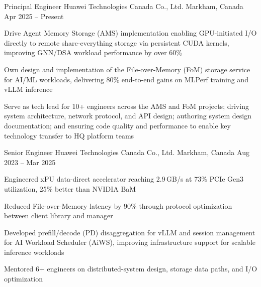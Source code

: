 

\begin{cventries}

  \cventry
    {Principal Engineer} %
    {Huawei Technologies Canada Co., Ltd.} %
    {Markham, Canada} %
    {Apr 2025 -- Present} %
    {
      \begin{cvitems} %
        \item {Drive Agent Memory Storage (AMS) implementation enabling GPU-initiated I/O directly to remote share-everything storage via persistent CUDA kernels, improving GNN/DSA workload performance by over 60\%}
        \item {Own design and implementation of the File-over-Memory (FoM) storage service for AI/ML workloads, delivering 80\% end-to-end gains on MLPerf training and vLLM inference}
        \item {Serve as tech lead for 10+ engineers across the AMS and FoM projects; driving system architecture, network protocol, and API design; authoring system design documentation; and ensuring code quality and performance to enable key technology transfer to HQ platform teams}
      \end{cvitems}
    }

  \cventry
    {Senior Engineer} %
    {Huawei Technologies Canada Co., Ltd.} %
    {Markham, Canada} %
    {Aug 2023 -- Mar 2025} %
    {
      \begin{cvitems} %
        \item {Engineered xPU data-direct accelerator reaching 2.9\,GB/s at 73\% PCIe Gen3 utilization, 25\% better than NVIDIA BaM}
        \item {Reduced File-over-Memory latency by 90\% through protocol optimization between client library and manager}
        \item {Developed prefill/decode (PD) disaggregation for vLLM and session management for AI Workload Scheduler (AiWS), improving infrastructure support for scalable inference workloads}
        \item {Mentored 6+ engineers on distributed-system design, storage data paths, and I/O optimization}
      \end{cvitems}
    }


\end{cventries}
